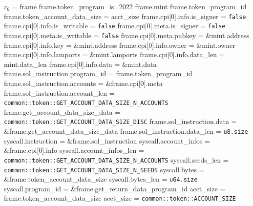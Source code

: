 \begin{algorithm}
\caption{GET-VAULT-SIZE}
\begin{algorithmic}
  \INPUT $r_6$ = frame
  \REQUIRE frame.token\_program\_is\_2022
  \REQUIRE frame.mint
  \REQUIRE frame.token\_program\_id
  \ENSURE frame.token\_account\_data\_size = acct\_size
    \STATE frame.cpi[0].info.is\_signer = \texttt{false}
    \STATE frame.cpi[0].info.is\_writable = \texttt{false}
    \STATE frame.cpi[0].meta.is\_signer = \texttt{false}
    \STATE frame.cpi[0].meta.is\_writable = \texttt{false}
    \STATE frame.cpi[0].meta.pubkey = \&mint.address
    \STATE frame.cpi[0].info.key = \&mint.address
    \STATE frame.cpi[0].info.owner = \&mint.owner
    \STATE frame.cpi[0].info.lamports = \&mint.lamports
    \STATE frame.cpi[0].info.data\_len = mint.data\_len
    \STATE frame.cpi[0].info.data = \&mint.data
    \STATE frame.sol\_instruction.program\_id = frame.token\_program\_id
    \STATE frame.sol\_instruction.accounts = \&frame.cpi[0].meta
    \STATE frame.sol\_instruction.account\_len =
      \texttt{common::token::GET\_ACCOUNT\_DATA\_SIZE\_N\_ACCOUNTS}
    \STATE frame.get\_account\_data\_size\_data =
      \texttt{common::token::GET\_ACCOUNT\_DATA\_SIZE\_DISC}
    \STATE frame.sol\_instruction.data = \&frame.get\_account\_data\_size\_data
    \STATE frame.sol\_instruction.data\_len = \texttt{u8.size}
    \STATE syscall.instruction = \&frame.sol\_instruction
    \STATE syscall.account\_infos = \&frame.cpi[0].info
    \STATE syscall.account\_infos\_len =
      \texttt{common::token::GET\_ACCOUNT\_DATA\_SIZE\_N\_ACCOUNTS}
    \STATE syscall.seeds\_len = \texttt{common::token::GET\_ACCOUNT\_DATA\_SIZE\_N\_SEEDS}
    \STATE {}
    \STATE syscall.bytes = \&frame.token\_account\_data\_size
    \STATE syscall.bytes\_len = \texttt{u64.size}
    \STATE syscall.program\_id = \&frame.get\_return\_data\_program\_id
    \STATE {}
    \STATE acct\_size = frame.token\_account\_data\_size
  \ELSE
    \STATE acct\_size = \texttt{common::token::ACCOUNT\_SIZE}
  \ENDIF
\ENDPROCEDURE
\end{algorithmic}
\end{algorithm}
